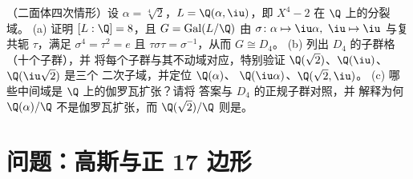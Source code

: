 \begin{exercise}[$\star\star\star$]\label{exo:b3:galois:12}
（二面体四次情形）设 $\alpha = \sqrt[4]2$，$L =
\Q(\alpha, \iu)$，即 $X^4 - 2$ 在 $\Q$ 上的分裂域。
(a) 证明 $[L : \Q] = 8$，且 $G =
\operatorname{Gal}(L/\Q)$ 由 $\sigma\colon
\alpha \mapsto \iu\alpha,\ \iu \mapsto \iu$ 与复共轭
$\tau$，满足 $\sigma^4 = \tau^2 = e$ 且
$\tau\sigma\tau = \sigma^{-1}$，从而 $G \cong D_4$。
(b) 列出 $D_4$ 的子群格（十个子群），并
将每个子群与其不动域对应，特别验证
$\Q(\sqrt2)$、$\Q(\iu)$、$\Q(\iu\sqrt2)$ 是三个
二次子域，并定位 $\Q(\alpha)$、
$\Q(\iu\alpha)$、$\Q(\sqrt2, \iu)$。
(c) 哪些中间域是 $\Q$ 上的伽罗瓦扩张？请将
答案与 $D_4$ 的正规子群对照，并
解释为何 $\Q(\alpha)/\Q$ 不是伽罗瓦扩张，而 $\Q(\sqrt2)/\Q$
则是。
\end{exercise}

\section{问题：高斯与正 17 边形}

